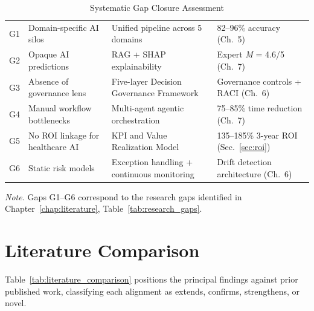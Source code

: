 \begin{table}[H]
\small
\tablestripes
\begin{tabularx}{\textwidth}{p{0.5cm} L L L}
\toprule
{} &  &  &  \\
\midrule
G1 & Domain-specific AI silos & Unified pipeline across 5 domains & 82--96\% accuracy (Ch.~5) \\
G2 & Opaque AI predictions & RAG + SHAP explainability & Expert \textit{M} = 4.6/5 (Ch.~7) \\
G3 & Absence of governance lens & Five-layer Decision Governance Framework & Governance controls + RACI (Ch.~6) \\
G4 & Manual workflow bottlenecks & Multi-agent agentic orchestration & 75--85\% time reduction (Ch.~7) \\
G5 & No ROI linkage for healthcare AI & KPI and Value Realization Model & 135--185\% 3-year ROI (Sec.~\ref{sec:roi}) \\
G6 & Static risk models & Exception handling + continuous monitoring & Drift detection architecture (Ch.~6) \\
\bottomrule
\end{tabularx}
\caption{Systematic Gap Closure Assessment}
\label{tab:gap_closure}
\vspace{0.5em}\noindent\textit{Note.} Gaps G1--G6 correspond to the research gaps identified in Chapter~\ref{chap:literature}, Table~\ref{tab:research_gaps}.
\end{table}


\section{Literature Comparison}
\label{sec:literature_comparison}

Table~\ref{tab:literature_comparison} positions the principal findings against prior published work, classifying each alignment as extends, confirms, strengthens, or novel.

